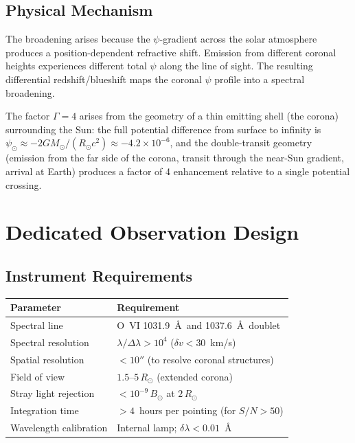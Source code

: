 \documentclass[11pt]{article}
\newcommand{\ee}[1]{\times 10^{#1}}
\newcommand{\Rsun}{R_\odot}
\begin{document}
\subsection{Physical Mechanism}

The broadening arises because the $\psi$-gradient across the solar
atmosphere produces a position-dependent refractive shift.  Emission
from different coronal heights experiences different total $\psi$
along the line of sight.  The resulting differential redshift/blueshift
maps the coronal $\psi$ profile into a spectral broadening.

The factor $\Gamma = 4$ arises from the geometry of a thin emitting
shell (the corona) surrounding the Sun:  the full potential difference
from surface to infinity is $\psi_\odot \approx -2GM_\odot/(R_\odot c^2)
\approx -4.2\ee{-6}$, and the double-transit geometry (emission from
the far side of the corona, transit through the near-Sun gradient,
arrival at Earth) produces a factor of 4 enhancement relative to a
single potential crossing.

\section{Dedicated Observation Design}
\label{sec:corona-design}

\subsection{Instrument Requirements}

\begin{center}
\begin{tabular}{lp{7cm}}
\toprule
\textbf{Parameter} & \textbf{Requirement} \\
\midrule
Spectral line & O~VI 1031.9~\AA\ and 1037.6~\AA\ doublet \\
Spectral resolution & $\lambda/\Delta\lambda > 10^4$ ($\delta v < 30$~km/s) \\
Spatial resolution & $< 10''$ (to resolve coronal structures) \\
Field of view & $1.5$--$5\,\Rsun$ (extended corona) \\
Stray light rejection & $< 10^{-9}\,B_\odot$ at $2\,\Rsun$ \\
Integration time & $> 4$~hours per pointing (for $S/N > 50$) \\
Wavelength calibration & Internal lamp; $\delta\lambda < 0.01$~\AA \\
\bottomrule
\end{tabular}
\end{center}
\end{document}
